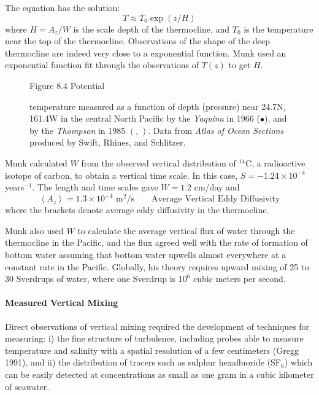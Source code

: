 The equation has the solution:
\begin{equation}
T \approx T_0 \exp (z/H)
\end{equation}
where $H=A_z/W$ is the scale depth of the thermocline, and $T_0$ is the
temperature near the top of the thermocline. Observations of the shape of the
deep thermocline are indeed very close to a exponential function.
Munk used an exponential function fit through the observations of $T(z)$ to get
$H$.

\begin{figure}[t!]
\footnotesize
Figure 8.4 Potential \rule{0mm}{3ex}temperature measured as a
function of depth (pressure) near 24.7\degrees N, 161.4\degrees W
in the central North Pacific by the \textit{Yaquina} in 1966 ($\bullet$), and by
the \textit{Thompson} in 1985 $\left( _\square \;\right)$. Data from
\textit{Atlas of Ocean Sections} produced by Swift, Rhines, and Schlitzer.
\label{fig:mixing}
\vspace{-3ex}
\end{figure}

Munk calculated $W$ from the observed vertical distribution of $^{14}$C, a
radioactive isotope of carbon, to obtain a vertical time scale. In this case,
$S=-1.24 \times 10^{-4}$ years$^{-1}$. The length and time scales gave $W=1.2$
cm/day and
\begin{equation}
\left< A_z \right> = 1.3 \times 10^{-4} \text{ m$^2$/s} \qquad \text{Average
Vertical Eddy Diffusivity}
\end{equation}
where the brackets denote average eddy diffusivity in the thermocline.

Munk also used $W$ to calculate the average vertical flux of water through
the thermocline in the Pacific, and the flux agreed well with the rate of
formation of bottom water assuming that bottom water upwells almost everywhere
at a constant rate in the Pacific. Globally, his theory requires upward mixing of 25
to 30 Sverdrups of water, where one Sverdrup is $10^6$ cubic meters per second.

\paragraph{Measured Vertical Mixing}
Direct observations of vertical mixing required the
development of techniques for measuring: i) the fine structure of
turbulence, including probes able to measure temperature and
salinity with a spatial resolution of a few centimeters (Gregg 1991), and ii) the distribution
of tracers such as sulphur hexafluoride (SF$_6$) which can be easily detected at
concentrations as small as one gram in a cubic kilometer of seawater.

